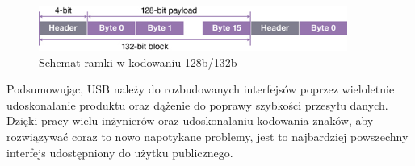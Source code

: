 \documentclass{BscUS}
\begin{document}
\begin{figure}[H]
\centering
\includegraphics[width=0.9\textwidth]{./img/128to132coding}
\caption{Schemat ramki w kodowaniu 128b/132b \cite{128to132coding}}
\label{fig:128to132coding}
\end{figure}
\indent Podsumowując, USB należy do rozbudowanych interfejsów poprzez wieloletnie udoskonalanie produktu oraz dążenie do poprawy szybkości przesyłu danych. Dzięki pracy wielu inżynierów oraz udoskonalaniu kodowania znaków, aby rozwiązywać coraz to nowo napotykane problemy, jest to najbardziej powszechny interfejs udostępniony do użytku publicznego.
\end{document}
